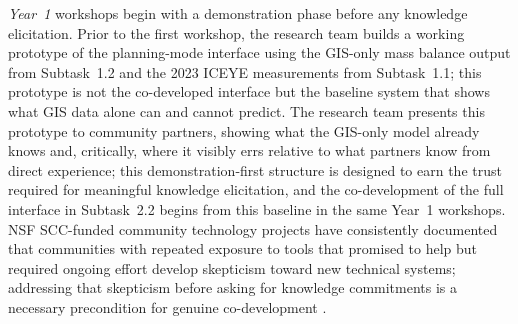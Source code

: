 \documentclass[11pt]{article}
\begin{document}
\textit{Year~1} workshops begin with a demonstration phase before any knowledge
elicitation.
Prior to the first workshop, the research team builds a working prototype of the
planning-mode interface using the GIS-only mass balance output from Subtask~1.2
and the 2023 ICEYE measurements from Subtask~1.1; this prototype is not the
co-developed interface but the baseline system that shows what GIS data alone
can and cannot predict.
The research team presents this prototype to community partners, showing what the
GIS-only model already knows and, critically, where it visibly errs relative to
what partners know from direct experience; this demonstration-first structure is
designed to earn the trust required for meaningful knowledge elicitation, and the
co-development of the full interface in Subtask~2.2 begins from this baseline
in the same Year~1 workshops.
NSF SCC-funded community technology projects have consistently documented that
communities with repeated exposure to tools that promised to help but required ongoing
effort develop skepticism toward new technical systems; addressing that skepticism
before asking for knowledge commitments is a necessary precondition for genuine
co-development \cite{placeholder_scc_trust}.
\end{document}
